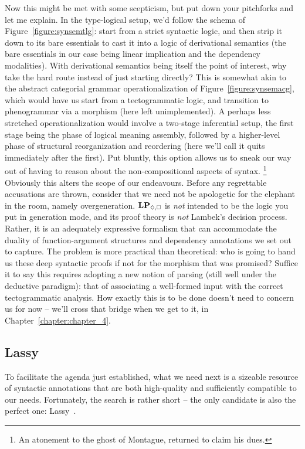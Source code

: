 Now this might be met with some scepticism, but put down your pitchforks and let me explain.
In the type-logical setup, we'd follow the schema of Figure~\ref{figure:synsemtlg}: start from a strict syntactic logic, and then strip it down to its bare essentials to cast it into a logic of derivational semantics (the bare essentials in our case being linear implication and the dependency modalities).
With derivational semantics being itself the point of interest, why take the hard route instead of just starting directly?
This is somewhat akin to the abstract categorial grammar operationalization of Figure~\ref{figure:synsemacg}, which would have us start from a tectogrammatic logic, and transition to phenogrammar via a morphism (here left unimplemented).
A perhaps less stretched operationalization would involve a two-stage inferential setup, the first stage being the phase of logical meaning assembly, followed by a higher-level phase of structural reorganization and reordering (here we'll call it quits immediately after the first).
Put bluntly, this option allows us to sneak our way out of having to reason about the non-compositional aspects of syntax.%
	\footnote{An atonement to the ghost of Montague, returned to claim his dues.}
Obviously this alters the scope of our endeavours.
Before any regrettable accusations are thrown, consider that we need not be apologetic for the elephant in the room, namely overgeneration.
$\LPplus$ is \textit{not} intended to be the logic you put in generation mode, and its proof theory is \textit{not} Lambek's decision process.
Rather, it is an adequately expressive formalism that can accommodate the duality of function-argument structures and dependency annotations we set out to capture.
The problem is more practical than theoretical: who is going to hand us these deep syntactic proofs if not for the morphism that was promised?
Suffice it to say this requires adopting a new notion of parsing (still well under the deductive paradigm): that of associating a well-formed input with the correct tectogrammatic analysis.
How exactly this is to be done doesn't need to concern us for now -- we'll cross that bridge when we get to it, in Chapter~\ref{chapter:chapter_4}.

\subsection{Lassy}
To facilitate the agenda just established, what we need next is a sizeable resource of syntactic annotations that are both high-quality and sufficiently compatible to our needs.
Fortunately, the search is rather short -- the only candidate is also the perfect one: Lassy~\cite{van2013large}.

